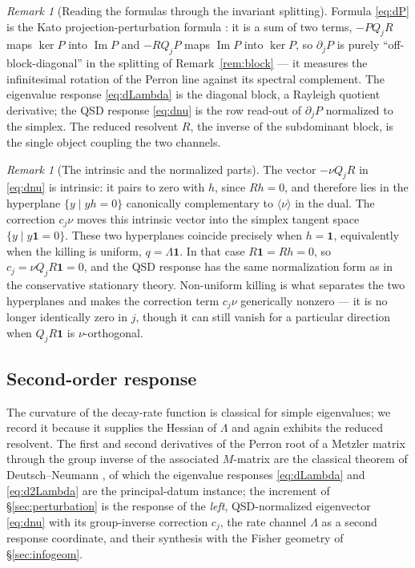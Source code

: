 \documentclass[11pt,reqno]{amsart}
\theoremstyle{plain}
\theoremstyle{definition}
\theoremstyle{remark}
\newtheorem{remark}[theorem]{Remark}
\newcommand{\one}{\mathbf{1}}
\DeclareMathOperator{\Imm}{Im}
\begin{document}
\begin{remark}[Reading the formulas through the invariant splitting]
Formula \eqref{eq:dP} is the Kato projection-perturbation formula
\cite[Ch.~II, \S2.1]{Kato1995}: it is a sum of two terms, $-PQ_jR$ maps $\ker P$
into $\Imm P$ and $-RQ_jP$ maps $\Imm P$ into $\ker P$, so $\partial_jP$ is purely
``off-block-diagonal'' in the splitting of Remark~\ref{rem:block} --- it measures
the infinitesimal rotation of the Perron line against its spectral complement. The
eigenvalue response \eqref{eq:dLambda} is the diagonal block, a Rayleigh quotient
derivative; the QSD response \eqref{eq:dnu} is the row read-out of $\partial_jP$
normalized to the simplex. The reduced resolvent $R$, the inverse of the
subdominant block, is the single object coupling the two channels.
\end{remark}

\begin{remark}[The intrinsic and the normalized parts]\label{rem:intrinsic}
The vector $-\nu Q_jR$ in \eqref{eq:dnu} is intrinsic: it pairs to zero with $h$,
since $Rh=0$, and therefore lies in the hyperplane $\{y\mid yh=0\}$ canonically
complementary to $\langle \nu\rangle$ in the dual. The correction $c_j\nu$ moves
this intrinsic vector into the simplex tangent space $\{y\mid y\one=0\}$.
These two hyperplanes coincide precisely when $h=\one$, equivalently when the
killing is uniform, $q=\Lambda\one$. In that case $R\one=Rh=0$, so
$c_j=\nu Q_jR\one=0$, and the QSD response has the same normalization form as in the
conservative stationary theory. Non-uniform killing is what separates the two
hyperplanes and makes the correction term $c_j\nu$ generically nonzero --- it is no
longer identically zero in $j$, though it can still vanish for a particular
direction when $Q_jR\one$ is $\nu$-orthogonal.
\end{remark}

\subsection{Second-order response}

The curvature of the decay-rate function is classical for simple eigenvalues; we
record it because it supplies the Hessian of $\Lambda$ and again exhibits the reduced
resolvent. The first and second derivatives of the Perron root of a Metzler matrix through the group
inverse of the associated $M$-matrix are the classical theorem of Deutsch--Neumann
\cite{DeutschNeumann1984}, of which the eigenvalue responses \eqref{eq:dLambda} and
\eqref{eq:d2Lambda} are the principal-datum instance; the increment of \S\ref{sec:perturbation} is the
response of the \emph{left}, QSD-normalized eigenvector \eqref{eq:dnu} with its group-inverse
correction $c_j$, the rate channel $\Lambda$ as a second response coordinate, and their synthesis with
the Fisher geometry of \S\ref{sec:infogeom}.
\end{document}
